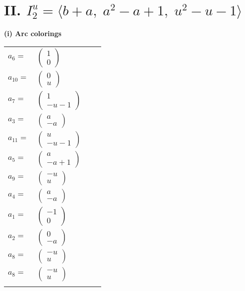 \documentclass[1p]{elsarticle_modified}
\theoremstyle{definition}
\begin{document}
\centering \section*{II. $I^u_{2}= \langle b+a,\;a^2- a+1,\;u^2- u-1 \rangle$}
\flushleft \textbf{(i) Arc colorings}\\
\begin{tabular}{m{7pt} m{180pt} m{7pt} m{180pt} }
\flushright $a_{6}=$&$\begin{pmatrix}1\\0\end{pmatrix}$ \\
\flushright $a_{10}=$&$\begin{pmatrix}0\\u\end{pmatrix}$ \\
\flushright $a_{7}=$&$\begin{pmatrix}1\\- u-1\end{pmatrix}$ \\
\flushright $a_{3}=$&$\begin{pmatrix}a\\- a\end{pmatrix}$ \\
\flushright $a_{11}=$&$\begin{pmatrix}u\\- u-1\end{pmatrix}$ \\
\flushright $a_{5}=$&$\begin{pmatrix}a\\- a+1\end{pmatrix}$ \\
\flushright $a_{9}=$&$\begin{pmatrix}- u\\u\end{pmatrix}$ \\
\flushright $a_{4}=$&$\begin{pmatrix}a\\- a\end{pmatrix}$ \\
\flushright $a_{1}=$&$\begin{pmatrix}-1\\0\end{pmatrix}$ \\
\flushright $a_{2}=$&$\begin{pmatrix}0\\- a\end{pmatrix}$ \\
\flushright $a_{8}=$&$\begin{pmatrix}- u\\u\end{pmatrix}$\\ \flushright $a_{8}=$&$\begin{pmatrix}- u\\u\end{pmatrix}$\\&\end{tabular}
\end{document}
